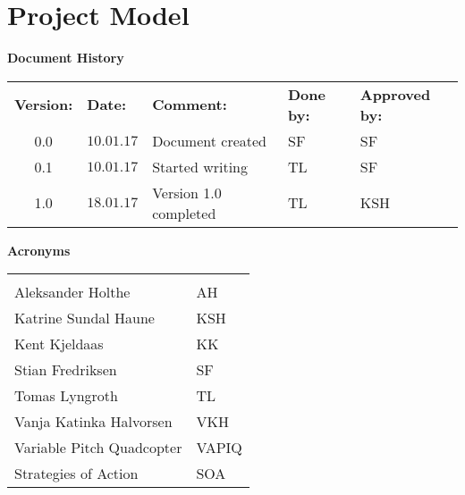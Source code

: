\chapter{Project Model}
\label{app:projectmodel}




\begin{center}
\textbf{\large Document History} \\
\begin{tabular}{cllll}
\rowcolor{cadetgrey}
\textbf{Version:}    &\textbf{Date:} 	 &\textbf{Comment:}    &\textbf{Done by:}   &\textbf{Approved by:}  \\

0.0       & $10.01.17$       & Document created  & SF    & SF          \\ \rowcolor{gainsboro}
0.1       & $10.01.17$       & Started writing  & TL    & SF          \\
1.0       & $18.01.17$       & Version 1.0 completed  & TL    & KSH          \\ 
\end{tabular}                                                                   
\end{center}

\vspace*{3.0 cm}

\begin{center}
\textbf{\large Acronyms} \\
\begin{tabular}{ll}
\rowcolor{cadetgrey}
    &   \\
Aleksander Holthe      & AH     \\\rowcolor{gainsboro}
Katrine Sundal Haune  & KSH \\
Kent Kjeldaas         & KK \\\rowcolor{gainsboro}
Stian Fredriksen      & SF  \\
Tomas Lyngroth       & TL   \\\rowcolor{gainsboro}
Vanja Katinka Halvorsen     & VKH   \\
Variable Pitch Quadcopter   & VAPIQ \\\rowcolor{gainsboro}
Strategies of Action    & SOA

\end{tabular}                                                             
\end{center}


